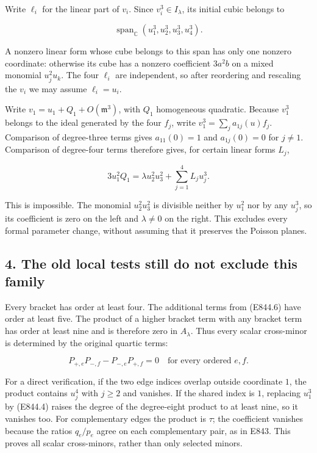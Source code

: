 Write \(\ell_i\) for the linear part of \(v_i\).
Since \(v_i^3\in I_\lambda\), its initial cubic belongs to

\[
                 \operatorname{span}_{\mathbb C}
                           (u_1^3,u_2^3,u_3^3,u_4^3).
 \tag{E844.10}
\]

A nonzero linear form whose cube belongs to this span has only one nonzero
coordinate: otherwise its cube has a nonzero coefficient \(3a^2b\)
on a mixed monomial \(u_j^2u_k\).
The four \(\ell_i\) are independent, so after reordering and rescaling the
\(v_i\) we may assume \(\ell_i=u_i\).

Write \(v_1=u_1+Q_1+O(\mathfrak m^3)\), with \(Q_1\) homogeneous quadratic.
Because \(v_1^3\) belongs to the ideal generated by the four \(f_j\), write
\(v_1^3=\sum_j a_{1j}(u)f_j\).
Comparison of degree-three terms gives \(a_{11}(0)=1\) and
\(a_{1j}(0)=0\) for \(j\ne1\).
Comparison of degree-four terms therefore gives, for certain linear forms
\(L_j\),

\[
              3u_1^2Q_1
                 =\lambda u_2^2u_3^2+\sum_{j=1}^4L_j u_j^3.
 \tag{E844.11}
\]

This is impossible. The monomial \(u_2^2u_3^2\) is divisible neither by
\(u_1^2\) nor by any \(u_j^3\), so its coefficient is zero on the left
and \(\lambda\ne0\) on the right. This excludes every formal parameter
change, without assuming that it preserves the Poisson planes.

\subsection{4. The old local tests still do not exclude this family}\label{SF-E844:the-old-local-tests-still-do-not-exclude-this-family}

Every bracket has order at least four. The additional terms from (E844.6)
have order at least five. The product of a higher bracket term with any
bracket term has order at least nine and is therefore zero in \(A_\lambda\).
Thus every scalar cross-minor is determined by the original quartic terms:

\[
                P_{+,e}P_{-,f}-P_{-,e}P_{+,f}=0
                       \quad\text{for every ordered }e,f.
 \tag{E844.12}
\]

For a direct verification, if the two edge indices overlap outside
coordinate \(1\), the product contains \(u_j^4\) with \(j\ge2\) and vanishes.
If the shared index is \(1\), replacing \(u_1^3\) by (E844.4) raises the
degree of the degree-eight product to at least nine, so it vanishes too.
For complementary edges the product is \(\tau\); the coefficient vanishes
because the ratios \(q_e/p_e\) agree on each complementary pair, as in E843.
This proves all scalar cross-minors, rather than only selected minors.

